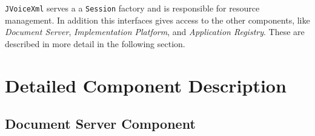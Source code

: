 \documentclass[11pt,a4paper]{article}
\begin{document}
\begin{center}
\end{center}


\texttt{JVoiceXml} serves a a \texttt{Session} factory and is responsible
for resource management. In addition this interfaces gives access to the other
components, like \emph{Document Server}, \emph{Implementation Platform}, and
\emph{Application Registry}. These are described in more detail in the following
section.

\section{Detailed Component Description}
\label{sec:deta-comp-descr}

\subsection{Document Server Component}
\label{sec:docum-serv-comp}
\end{document}
